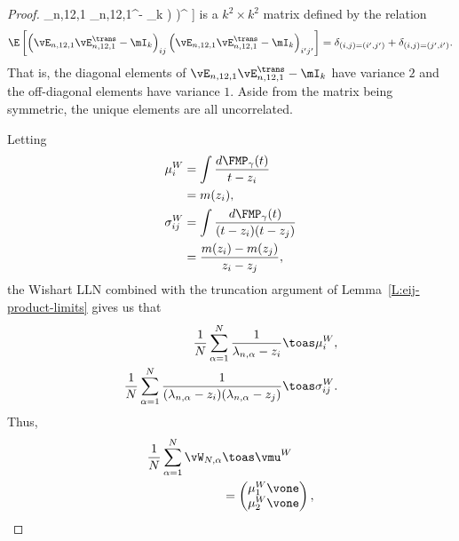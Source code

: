 \begin{proof}
                    \vE_{n,12,1} \vE_{n,12,1}^\trans - \mI_k
                \right) \! \!
            \Big)^{\! \trans}
        \Big]
    \)
    is a $k^2 \times k^2$ matrix defined by the relation
    \[
        \E \left[
            \left( 
                \vE_{n,12,1} \vE_{n,12,1}^\trans - \mI_k
            \right)_{ij}
            \left( 
                \vE_{n,12,1} \vE_{n,12,1}^\trans - \mI_k
            \right)_{i'j'}
        \right]
        =
        \delta_{(i,j) = (i',j')}
        +
        \delta_{(i,j) = (j',i')}.
    \]
    That is, the diagonal elements of 
    $\vE_{n,12,1} \vE_{n,12,1}^\trans - \mI_k$ have variance $2$ and
    the off-diagonal elements have variance $1$.  Aside from the matrix
    being symmetric, the unique elements are all uncorrelated.
    
    Letting
    \begin{align*}
        \mu^W_i
            &=
                \int \frac{ d\FMP_\gamma(t) }
                          { t - z_i } \\
            &=
                m( z_i ), \\
        \sigma^W_{ij}
            &=
                \int \frac{ d\FMP_\gamma(t) }
                          { (t - z_i)(t - z_j) } \\
            &=
                \frac{ m( z_i ) - m( z_j ) }
                     { z_i - z_j },
    \end{align*}
    the Wishart LLN combined with the truncation argument of
    Lemma~\ref{L:eij-product-limits} gives us that
    \begin{align*}
        \frac{1}{N}
        \sum_{\alpha=1}^N
            \frac{1}{  \lambda_{n,\alpha} - z_i  }
            &\toas
                \mu^W_{i}, \\
        \frac{1}{N}
        \sum_{\alpha=1}^N
            \frac{1}{ ( \lambda_{n,\alpha} - z_i )
                      ( \lambda_{n,\alpha} - z_j ) }
            &\toas
                \sigma^W_{ij}.
    \end{align*}
    Thus,
    \begin{align*}
        \frac{1}{N}
        \sum_{\alpha=1}^N
            \vW_{N,\alpha}
            &\toas
                \vmu^W \\
            &=
                \left(
                \begin{matrix}
                    \mu^W_1 \vone \\
                    \mu^W_2 \vone
                \end{matrix}
                \right), \\

\end{align*}
\end{proof}
